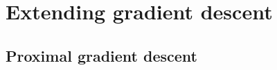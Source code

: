 \documentclass{beamer}
\numberwithin{equation}{section}
\begin{document}
\section{Extending gradient descent}

\subsection{Proximal gradient descent}

\end{document}
